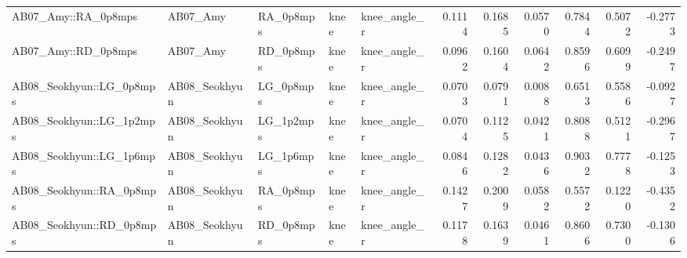 \begin{table}
\begin{tabular}{lllllrrrrrr}
AB07_Amy::RA_0p8mps & AB07_Amy & RA_0p8mps & knee & knee_angle_r & 0.1114 & 0.1685 & 0.0570 & 0.7844 & 0.5072 & -0.2773 \\
AB07_Amy::RD_0p8mps & AB07_Amy & RD_0p8mps & knee & knee_angle_r & 0.0962 & 0.1604 & 0.0642 & 0.8596 & 0.6099 & -0.2497 \\
AB08_Seokhyun::LG_0p8mps & AB08_Seokhyun & LG_0p8mps & knee & knee_angle_r & 0.0703 & 0.0791 & 0.0088 & 0.6513 & 0.5586 & -0.0927 \\
AB08_Seokhyun::LG_1p2mps & AB08_Seokhyun & LG_1p2mps & knee & knee_angle_r & 0.0704 & 0.1125 & 0.0421 & 0.8088 & 0.5121 & -0.2967 \\
AB08_Seokhyun::LG_1p6mps & AB08_Seokhyun & LG_1p6mps & knee & knee_angle_r & 0.0846 & 0.1282 & 0.0436 & 0.9032 & 0.7778 & -0.1253 \\
AB08_Seokhyun::RA_0p8mps & AB08_Seokhyun & RA_0p8mps & knee & knee_angle_r & 0.1427 & 0.2009 & 0.0582 & 0.5572 & 0.1220 & -0.4352 \\
AB08_Seokhyun::RD_0p8mps & AB08_Seokhyun & RD_0p8mps & knee & knee_angle_r & 0.1178 & 0.1639 & 0.0461 & 0.8606 & 0.7300 & -0.1306 \\
\bottomrule
\end{tabular}
\end{table}
